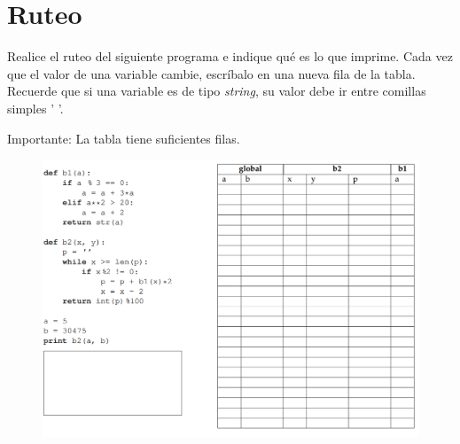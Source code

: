 \section{Ruteo}

Realice el ruteo del siguiente programa e indique qué es lo que imprime. Cada vez que el valor de una variable cambie, escríbalo en una nueva fila de la tabla. Recuerde que si una variable
es de tipo \textit{string}, su valor debe ir entre comillas simples ’ ’.

Importante: La tabla tiene suficientes filas.

\begin{figure}[h]
	\includegraphics[scale=0.67]{Imagenes/1_c1_2015_1.png}
\end{figure}

\newpage